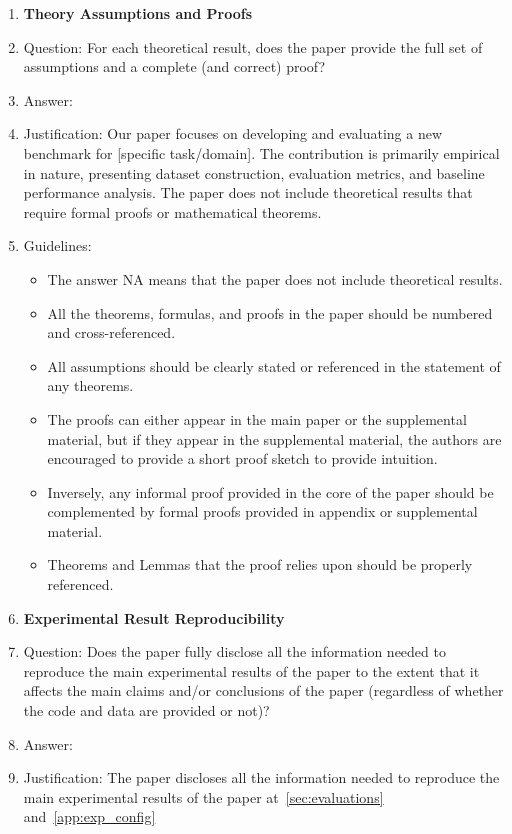 \documentclass{article}
\begin{document}
\begin{enumerate}
\item {\bf Theory Assumptions and Proofs}
    \item[] Question: For each theoretical result, does the paper provide the full set of assumptions and a complete (and correct) proof?
    \item[] Answer: \answerNA{}  %
    \item[] Justification: Our paper focuses on developing and evaluating a new benchmark for [specific task/domain]. The contribution is primarily empirical in nature, presenting dataset construction, evaluation metrics, and baseline performance analysis. The paper does not include theoretical results that require formal proofs or mathematical theorems.
    \item[] Guidelines:
    \begin{itemize}
        \item The answer NA means that the paper does not include theoretical results. 
        \item All the theorems, formulas, and proofs in the paper should be numbered and cross-referenced.
        \item All assumptions should be clearly stated or referenced in the statement of any theorems.
        \item The proofs can either appear in the main paper or the supplemental material, but if they appear in the supplemental material, the authors are encouraged to provide a short proof sketch to provide intuition. 
        \item Inversely, any informal proof provided in the core of the paper should be complemented by formal proofs provided in appendix or supplemental material.
        \item Theorems and Lemmas that the proof relies upon should be properly referenced. 
    \end{itemize}

    \item {\bf Experimental Result Reproducibility}
    \item[] Question: Does the paper fully disclose all the information needed to reproduce the main experimental results of the paper to the extent that it affects the main claims and/or conclusions of the paper (regardless of whether the code and data are provided or not)?
    \item[] Answer: \answerYes{} %
    \item[] Justification: The paper discloses all the information needed to reproduce the main experimental results of the paper at~\ref{sec:evaluations} and~\ref{app:exp_config}


\end{enumerate}
\end{document}
